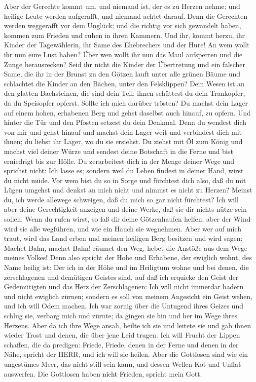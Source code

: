  Aber der Gerechte kommt um, und niemand ist, der es zu
Herzen nehme; und heilige Leute werden aufgerafft, und niemand achtet
darauf. Denn die Gerechten werden weggerafft vor dem Unglück;
 und die richtig vor sich gewandelt haben, kommen zum
Frieden und ruhen in ihren Kammern.  Und ihr, kommt herzu,
ihr Kinder der Tagewählerin, ihr Same des Ehebrechers und der Hure!
 An wem wollt ihr nun eure Lust haben? Über wen wollt ihr
nun das Maul aufsperren und die Zunge herausrecken? Seid ihr nicht die
Kinder der Übertretung und ein falscher Same,  die ihr in
der Brunst zu den Götzen lauft unter alle grünen Bäume und schlachtet
die Kinder an den Bächen, unter den Felsklippen?  Dein Wesen
ist an den glatten Bachsteinen, die sind dein Teil; ihnen schüttest du
dein Trankopfer, da du Speisopfer opferst. Sollte ich mich darüber
trösten?  Du machst dein Lager auf einem hohen, erhabenen
Berg und gehst daselbst auch hinauf, zu opfern.  Und hinter
die Tür und den Pfosten setzest du dein Denkmal. Denn du wendest dich
von mir und gehst hinauf und machst dein Lager weit und verbindest dich
mit ihnen; du liebst ihr Lager, wo du sie ersiehst.  Du
ziehst mit Öl zum König und machst viel deiner Würze und sendest deine
Botschaft in die Ferne und bist erniedrigt bis zur Hölle. 
Du zerarbeitest dich in der Menge deiner Wege und sprichst nicht: Ich
lasse es; sondern weil du Leben findest in deiner Hand, wirst du nicht
müde.  Vor wem bist du so in Sorge und fürchtest dich also,
daß du mit Lügen umgehst und denkst an mich nicht und nimmst es nicht zu
Herzen? Meinst du, ich werde allewege schweigen, daß du mich so gar
nicht fürchtest?  Ich will aber deine Gerechtigkeit
anzeigen und deine Werke, daß sie dir nichts nütze sein sollen.
 Wenn du rufen wirst, so laß dir deine Götzenhaufen helfen;
aber der Wind wird sie alle wegführen, und wie ein Hauch sie wegnehmen.
Aber wer auf mich traut, wird das Land erben und meinen heiligen Berg
besitzen  und wird sagen: Machet Bahn, machet Bahn! räumet
den Weg, hebet die Anstöße aus dem Wege meines Volkes! 
Denn also spricht der Hohe und Erhabene, der ewiglich wohnt, des Name
heilig ist: Der ich in der Höhe und im Heiligtum wohne und bei denen,
die zerschlagenen und demütigen Geistes sind, auf daß ich erquicke den
Geist der Gedemütigten und das Herz der Zerschlagenen:  Ich
will nicht immerdar hadern und nicht ewiglich zürnen; sondern es soll
von meinem Angesicht ein Geist wehen, und ich will Odem machen.
 Ich war zornig über die Untugend ihres Geizes und schlug
sie, verbarg mich und zürnte; da gingen sie hin und her im Wege ihres
Herzens.  Aber da ich ihre Wege ansah, heilte ich sie und
leitete sie und gab ihnen wieder Trost und denen, die über jene Leid
trugen.  Ich will Frucht der Lippen schaffen, die da
predigen: Friede, Friede, denen in der Ferne und denen in der Nähe,
spricht der HERR, und ich will sie heilen.  Aber die
Gottlosen sind wie ein ungestümes Meer, das nicht still sein kann, und
dessen Wellen Kot und Unflat auswerfen.  Die Gottlosen
haben nicht Frieden, spricht mein Gott.

